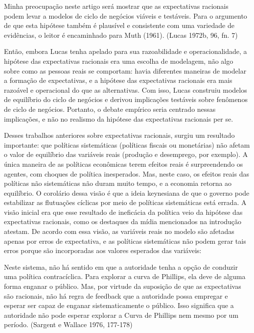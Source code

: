 \documentclass[12pt]{article}
\begin{document}
Minha preocupação neste artigo será mostrar que as expectativas racionais podem levar a modelos de ciclo de negócios viáveis e testáveis. Para o argumento de que esta hipótese também é plausível e consistente com uma variedade de evidências, o leitor é encaminhado para Muth (1961). (Lucas 1972b, 96, fn. 7)

Então, embora Lucas tenha apelado para sua razoabilidade e operacionalidade, a hipótese das expectativas racionais era uma escolha de modelagem, não algo sobre como as pessoas reais se comportam: havia diferentes maneiras de modelar a formação de expectativas, e a hipótese das expectativas racionais era mais razoável e operacional do que as alternativas. Com isso, Lucas construiu modelos de equilíbrio do ciclo de negócios e derivou implicações testáveis sobre fenômenos de ciclo de negócios. Portanto, o debate empírico seria centrado nessas implicações, e não no realismo da hipótese das expectativas racionais per se.

Desses trabalhos anteriores sobre expectativas racionais, surgiu um resultado importante: que políticas sistemáticas (políticas fiscais ou monetárias) não afetam o valor de equilíbrio das variáveis reais (produção e desemprego, por exemplo). A única maneira de as políticas econômicas terem efeitos reais é surpreendendo os agentes, com choques de política inesperados. Mas, neste caso, os efeitos reais das políticas não sistemáticas não duram muito tempo, e a economia retorna ao equilíbrio. O corolário dessa visão é que a ideia keynesiana de que o governo pode estabilizar as flutuações cíclicas por meio de políticas sistemáticas está errada. A visão inicial era que esse resultado de ineficácia da política veio da hipótese das expectativas racionais, como os destaques da mídia mencionados na introdução atestam. De acordo com essa visão, as variáveis reais no modelo são afetadas apenas por erros de expectativa, e as políticas sistemáticas não podem gerar tais erros porque são incorporadas aos valores esperados das variáveis:

Neste sistema, não há sentido em que a autoridade tenha a opção de conduzir uma política contracíclica. Para explorar a curva de Phillips, ela deve de alguma forma enganar o público. Mas, por virtude da suposição de que as expectativas são racionais, não há regra de feedback que a autoridade possa empregar e esperar ser capaz de enganar sistematicamente o público. Isso significa que a autoridade não pode esperar explorar a Curva de Phillips nem mesmo por um período. (Sargent e Wallace 1976, 177-178)
\end{document}
